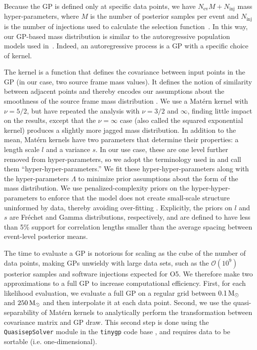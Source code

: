 \documentclass[preprint2,linenumbers]{aastex631}
\begin{document}
Because the \ac{GP} is defined only at specific data points, we have $N_{\text{ev}}M + N_{\text{inj}}$ mass hyper-parameters, where $M$ is the number of posterior samples per event and $N_{\text{inj}}$ is the number of injections used to calculate the selection function~\citep[see e.g.][]{vitale_inferring_2020,essick_estimating_2021}.
In this way, our \ac{GP}-based mass distribution is similar to the autoregressive population models used in~\citet{callister_parameter-free_2023}.
Indeed, an autoregressive process is a \ac{GP} with a specific choice of kernel.

The kernel is a function that defines the covariance between input points in the \ac{GP} (in our case, two source frame mass values). 
It defines the notion of similarity between adjacent points and thereby encodes our assumptions about the smoothness of the source frame mass distribution \citep{rasmussen_gaussian_2006}.
We use a Mat\'ern kernel \citep{handcock_bayesian_1993, stein_interpolation_1999} with $\nu = 5/2$, but have repeated the analysis with $\nu=3/2$ and $\infty$, finding little impact on the results, except that the $\nu=\infty$ case (also called the squared exponential kernel) produces a slightly more jagged mass distribution.
In addition to the mean, Mat\'ern kernels have two parameters that determine their properties: a length scale $l$ and a variance $s$.
In our use case, these are one level further removed from hyper-parameters, so we adopt the terminology used in \citet{callister_parameter-free_2023} and call them ``hyper-hyper-parameters.''
We fit these hyper-hyper-parameters along with the hyper-parameters $\Lambda$ to minimize prior assumptions about the form of the mass distribution.
We use penalized-complexity priors on the hyper-hyper-parameters to enforce that the model does not create small-scale structure uninformed by data, thereby avoiding over-fitting \citep{simpson_penalising_2017, simpson_garcpas_2022}. 
Explicitly, the priors on $l$ and $s$ are Fr\'echet and Gamma distributions, respectively, and are defined to have less than 5\% support for correlation lengths smaller than the average spacing between event-level posterior means.

The time to evaluate a \ac{GP} is notorious for scaling as the cube of the number of data points, making \acp{GP} unwieldy with large data sets, such as the $\mathcal{O}(10^9)$ posterior samples and software injections expected for \ac{O5}.
We therefore make two approximations to a full \ac{GP} to increase computational efficiency.
First, for each likelihood evaluation, we evaluate a full \ac{GP} on a regular grid between $0.1\,\text{M}_{\odot}$ and $250\,\text{M}_{\odot}$ and then interpolate it at each data point.
Second, we use the quasi-separability of Mat\'ern kernels to analytically perform the transformation between covariance matrix and \ac{GP} draw.
This second step is done using the \texttt{QuasisepSolver} module \citep{foreman-mackey_fast_2017} in the \texttt{tinygp} code base \citep{foreman-mackey_tinygp_2021}, and requires data to be sortable (i.e. one-dimensional).
\end{document}
